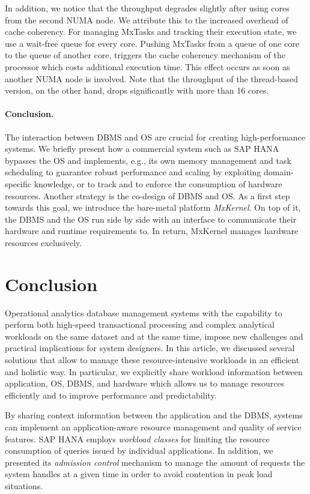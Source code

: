 \documentclass[11pt,dvipdfm]{article}
\begin{document}
In addition, we notice that the throughput degrades slightly after using cores from the second NUMA node.
We attribute this to the increased overhead of cache coherency.
For managing MxTasks and tracking their execution state, we use a wait-free queue for every core.
Pushing MxTasks from a queue of one core to the queue of another core, triggers the cache coherency mechanism of the processor which costs additional execution time.
This effect occurs as soon as another NUMA node is involved.
Note that the throughput of the thread-based version, on the other hand, drops significantly with more than 16 cores.


\paragraph*{Conclusion.}
The interaction between DBMS and OS are crucial for creating high-performance systems.
We briefly present how a commercial system such as SAP HANA bypasses the OS and implements, e.g., its own memory management and task scheduling to guarantee robust performance and scaling by exploiting domain-specific knowledge, or to track and to enforce the consumption of hardware resources.
Another strategy is the co-design of DBMS and OS.
As a first step towards this goal, we introduce the bare-metal platform \emph{MxKernel}.
On top of it, the DBMS and the OS run side by side with an interface to communicate their hardware and runtime requirements to.
In return, MxKernel manages hardware resources exclusively.



\section{Conclusion}
\label{nollhrm19:sec:conclusion}

Operational analytics database management systems with the capability to perform both high-speed transactional processing and complex analytical workloads on the same dataset and at the same time, impose new challenges and practical implications for system designers.
In this article, we discussed several solutions that allow to manage these resource-intensive workloads in an efficient and holistic way.
In particular, we explicitly share workload information between application, OS, DBMS, and hardware which allows us to manage resources efficiently and to improve performance and predictability.

By sharing context information between the application and the DBMS, systems can implement an application-aware resource management and quality of service features.
SAP HANA employs \emph{workload classes} for limiting the resource consumption of queries issued by individual applications.
In addition, we presented its \emph{admission control} mechanism to manage the amount of requests the system handles at a given time in order to avoid contention in peak load situations.
\end{document}
